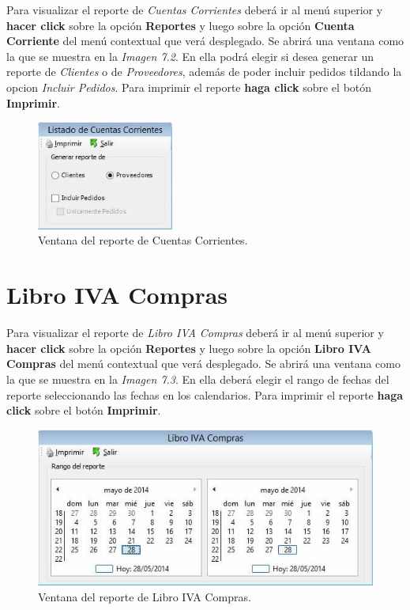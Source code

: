 \documentclass{book}
\begin{document}
Para visualizar el reporte de \textit{Cuentas Corrientes} deberá ir al menú superior y \textbf{hacer click} sobre la opción \textbf{Reportes} y luego sobre la opción \textbf{Cuenta Corriente} del menú contextual que verá desplegado. Se abrirá una ventana como la que se muestra en la \textit{Imagen 7.2}. En ella podrá elegir si desea generar un reporte de \textit{Clientes} o de \textit{Proveedores}, además de poder incluir pedidos tildando la opcion \textit{Incluir Pedidos}. Para imprimir el reporte \textbf{haga click} sobre el botón \textbf{Imprimir}.
\bigskip

\begin{figure}[H]
	\centering
	\includegraphics[width=0.4\textwidth]{images/ventanas/ventana-13.jpg}
	\caption{Ventana del reporte de Cuentas Corrientes.}
	\medskip
\end{figure}
\bigskip


\section{Libro IVA Compras}

Para visualizar el reporte de \textit{Libro IVA Compras} deberá ir al menú superior y \textbf{hacer click} sobre la opción \textbf{Reportes} y luego sobre la opción \textbf{Libro IVA Compras} del menú contextual que verá desplegado. Se abrirá una ventana como la que se muestra en la \textit{Imagen 7.3}. En ella deberá elegir el rango de fechas del reporte seleccionando las fechas en los calendarios. Para imprimir el reporte \textbf{haga click} sobre el botón \textbf{Imprimir}.
\bigskip

\begin{figure}[H]
	\centering
	\includegraphics[width=1.0\textwidth]{images/ventanas/ventana-14.jpg}
	\caption{Ventana del reporte de Libro IVA Compras.}
	\medskip
\end{figure}
\bigskip
\end{document}
